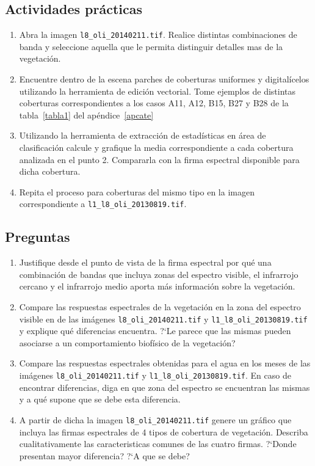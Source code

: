 \documentclass[hidelinks,12pt]{article}
\begin{document}
\subsection{Actividades pr\'acticas}
\begin{enumerate}
    \item Abra la imagen \texttt{l8\_oli\_20140211.tif}. Realice distintas
        combinaciones de banda y seleccione aquella que le permita distinguir 
        detalles mas de la vegetación.
    \item Encuentre dentro de la escena parches de coberturas uniformes y 
        digitalícelos utilizando la herramienta de edición vectorial. Tome
        ejemplos de distintas coberturas correspondientes a los casos A11, A12,
        B15, B27 y B28 de la tabla~\ref{tabla1} del ap\'endice~\ref{apcate}
    \item Utilizando la herramienta de extracción de estadísticas en \'area de
        clasificaci\'on
        calcule y grafique la media correspondiente a cada cobertura analizada 
        en el punto 2. Compararla con la firma espectral disponible para dicha
        cobertura.
    \item Repita el proceso para coberturas del mismo tipo en la imagen 
        correspondiente a \texttt{l1\_l8\_oli\_20130819.tif}.
\end{enumerate}
\subsection{Preguntas}
\begin{enumerate}
    \item Justifique desde el punto de vista de la firma espectral por qué una
        combinación de bandas que incluya zonas del espectro visible, el
        infrarrojo cercano y el infrarrojo medio aporta más información sobre la
        vegetación.
    \item Compare las respuestas espectrales de la vegetación en la zona del
        espectro visible en de las im\'agenes \texttt{l8\_oli\_20140211.tif}
        y \texttt{l1\_l8\_oli\_20130819.tif} y explique qué diferencias
        encuentra. ?`Le parece que las mismas pueden asociarse a un
        comportamiento biof\'isico de la vegetaci\'on?
    \item Compare las respuestas espectrales obtenidas para el agua en los meses
        de las im\'agenes \texttt{l8\_oli\_20140211.tif}
        y \texttt{l1\_l8\_oli\_20130819.tif}. En caso de encontrar diferencias, 
        diga en que zona del espectro se encuentran las mismas y a qué supone que 
        se debe esta diferencia.
    \item A partir de dicha la imagen \texttt{l8\_oli\_20140211.tif} genere un 
        gráfico que incluya las firmas espectrales de 4 tipos de cobertura de 
        vegetación. Describa cualitativamente las caracteristicas comunes de las
        cuatro firmas. ?`Donde presentan mayor diferencia? ?`A que se debe?
\end{enumerate}
\end{document}
